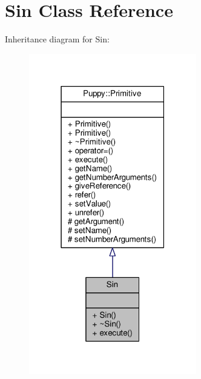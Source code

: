 \hypertarget{classSin}{}\section{Sin Class Reference}
\label{classSin}


Inheritance diagram for Sin\+:
\nopagebreak
\begin{figure}[H]
\begin{center}
\leavevmode
\includegraphics[width=207pt]{classSin__inherit__graph}
\end{center}
\end{figure}


